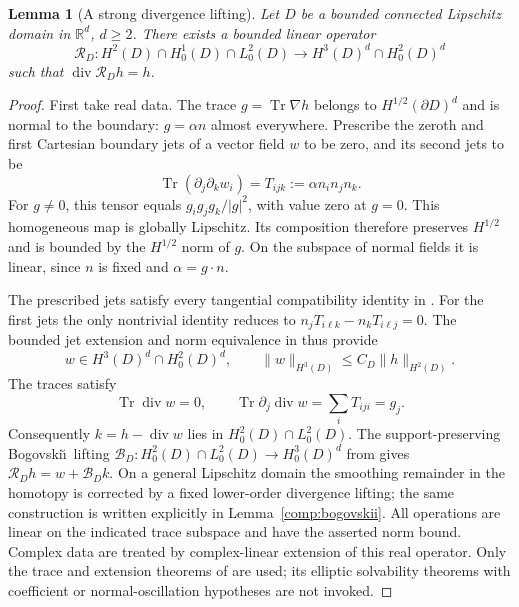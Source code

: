 \documentclass[11pt,a4paper]{article}
\newtheorem{lemma}[theorem]{Lemma}
\theoremstyle{remark}
\numberwithin{equation}{section}
\begin{document}
\begin{lemma}[A strong divergence lifting]\label{lem:g-stronglift}
Let $D$ be a bounded connected Lipschitz domain in $\mathbb R^d$, $d\ge2$. There exists
a bounded linear operator
\[
 \mathcal R_D:H^2(D)\cap H^1_0(D)\cap L^2_0(D)
 \longrightarrow H^3(D)^d\cap H^2_0(D)^d
\]
such that $\operatorname{div}\mathcal R_D h=h$.
\end{lemma}
\begin{proof}
First take real data. The trace $g=\operatorname{Tr}\nabla h$ belongs to
$H^{1/2}(\partial D)^d$ and is normal to the boundary: $g=\alpha n$ almost
everywhere. Prescribe the zeroth and first Cartesian boundary jets of a vector
field $w$ to be zero, and its second jets to be
\[
 \operatorname{Tr}(\partial_j\partial_k w_i)
 =T_{ijk}:=\alpha n_i n_j n_k.
\]
For $g\ne0$, this tensor equals $g_i g_j g_k/|g|^2$, with value zero at $g=0$.
This homogeneous map is globally Lipschitz. Its composition therefore preserves
$H^{1/2}$ and is bounded by the $H^{1/2}$ norm of $g$. On the subspace of
normal fields it is linear, since $n$ is fixed and $\alpha=g\cdot n$.

The prescribed jets satisfy every tangential compatibility identity in
\cite[Proposition 7.7, equation (7.69)]{MMS2010}. For the first jets the only
nontrivial identity reduces to
$n_j T_{i\ell k}-n_k T_{i\ell j}=0$. The bounded jet extension and norm
equivalence in \cite[Propositions 7.3 and 7.6]{MMS2010} thus provide
\[
 w\in H^3(D)^d\cap H^2_0(D)^d,
 \qquad \|w\|_{H^3(D)}\le C_D\|h\|_{H^2(D)}.
\]
The traces satisfy
\[
 \operatorname{Tr}\operatorname{div}w=0,\qquad
 \operatorname{Tr}\partial_j\operatorname{div}w
 =\sum_i T_{iji}=g_j.
\]
Consequently $k=h-\operatorname{div}w$ lies in $H^2_0(D)\cap L^2_0(D)$.
The support-preserving Bogovski\u\i\ lifting
$\mathcal B_D:H^2_0(D)\cap L^2_0(D)\to H^3_0(D)^d$
from \cite[Theorem~4.6 and Corollary~4.7(b)]{CostabelMcIntosh2010} gives
$\mathcal R_Dh=w+\mathcal B_Dk$.
On a general Lipschitz domain the smoothing remainder in the homotopy
is corrected by a fixed lower-order divergence lifting; the same
construction is written explicitly in Lemma~\ref{comp:bogovskii}.
All operations are linear on the indicated
trace subspace and have the asserted norm bound. Complex data are treated by
complex-linear extension of this real operator. Only the trace and extension
theorems of \cite{MMS2010} are used; its elliptic solvability theorems with
coefficient or normal-oscillation hypotheses are not invoked.
\end{proof}
\end{document}
